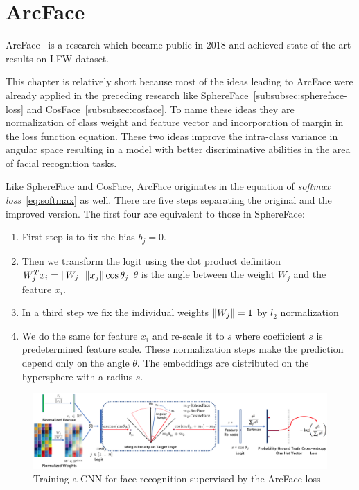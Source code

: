 \chapter{ArcFace}\label{ch:arcface}
ArcFace~\cite{ArcFace} is a research which became public in 2018 and achieved state-of-the-art results on LFW dataset.

This chapter is relatively short because most of the ideas leading to ArcFace were already applied in the preceding
research like SphereFace~\ref{subsubsec:sphereface-loss} and CosFace~\ref{subsubsec:cosface}.
To name these ideas they are normalization of class weight and feature vector and incorporation of margin in the loss
function equation.
These two ideas improve the intra-class variance in angular space resulting in a model with better discriminative
abilities in the area of facial recognition tasks.

Like SphereFace and CosFace, ArcFace originates in the equation of \textit{softmax loss}~\ref{eq:softmax} as well.
There are five steps separating the original and the improved version.
The first four are equivalent to those in SphereFace:
\begin{enumerate}
    \item First step is to fix the bias $b_j = 0$.
    \item Then we transform the logit using the dot product definition $W_j^T x_i = \left\lVert W_j\right\rVert \left\lVert x_j\right\rVert \cos \theta_j$
    $\theta$ is the angle between the weight $W_j$ and the feature $x_i$.
    \item In a third step we fix the individual weights $\left\lVert W_j\right\rVert = 1$ by $l_2$ normalization
    \item We do the same for feature $x_i$ and re-scale it to $s$ where coefficient $s$ is predetermined feature scale.
    These normalization steps make the prediction depend only on the angle $\theta$.
    The embeddings are distributed on the hypersphere with a radius $s$.
\end{enumerate}

\begin{figure}[H]
    \centering
    \includegraphics[width=\columnwidth]{images/arcface/arcface.png}
    \caption{Training a CNN for face recognition supervised by the ArcFace loss~\cite{ArcFace}}
    \label{fig:arcface}
\end{figure}

